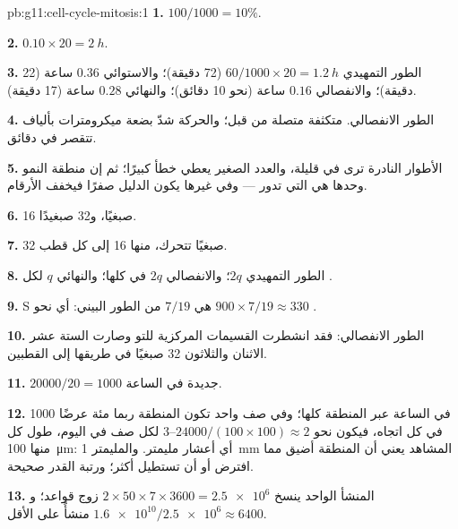 \begin{solution}{pb:g11:cell-cycle-mitosis:1}
\textbf{1.} $100/1000 = 10\%$.

\textbf{2.} $0.10 \times 20 = \qty{2}{h}$.

\textbf{3.} الطور التمهيدي $60/1000 \times 20 = \qty{1.2}{h}$ (72
دقيقة)؛ والاستوائي $0.36$ ساعة (22 دقيقة)؛ والانفصالي $0.16$ ساعة
(نحو 10 دقائق)؛ والنهائي $0.28$ ساعة (17 دقيقة).

\textbf{4.} الطور الانفصالي.  متكثفة متصلة من قبل؛ والحركة
شدّ بضعة ميكرومترات بألياف تتقصر في دقائق.

\textbf{5.} الأطوار النادرة ترى في  قليلة، والعدد الصغير يعطي
خطأ كبيرًا؛ ثم إن منطقة النمو وحدها هي التي تدور --- وفي غيرها يكون
الدليل صفرًا فيخفف الأرقام.

\textbf{6.} 16 صبغيًا، و32 صبغيدًا.

\textbf{7.} 32 صبغيًا تتحرك، منها 16 إلى كل قطب.

\textbf{8.} الطور التمهيدي $2q$؛ والانفصالي $2q$ في  كلها؛
والنهائي $q$ لكل .

\textbf{9.} S هي $7/19$ من الطور البيني: أي نحو $900 \times 7/19 \approx
330$ .

\textbf{10.} الطور الانفصالي: فقد انشطرت القسيمات المركزية للتو وصارت
  الستة عشر الاثنان والثلاثون 32 صبغيًا في طريقها إلى
القطبين.

\textbf{11.} $\num{20000}/20 = 1000$  جديدة في الساعة.

\textbf{12.} 1000  في الساعة عبر المنطقة كلها؛ وفي صف واحد تكون
المنطقة ربما مئة  عرضًا في كل اتجاه، فيكون نحو
$\num{24000}/(100 \times 100) \approx 2$--3  لكل صف في اليوم،
طول كل منها \qty{100}{\micro m}: أي أعشار مليمتر. والمليمتر
\qty{1}{mm} المشاهد يعني أن المنطقة أضيق مما افترض أو أن 
تستطيل أكثر؛ ورتبة القدر صحيحة.

\textbf{13.} المنشأ الواحد ينسخ $2 \times 50 \times 7 \times 3600 =
\num{2.5e6}$ زوج قواعد؛ و$\num{1.6e10}/\num{2.5e6} \approx 6400$
منشأً على الأقل.


\end{solution}
